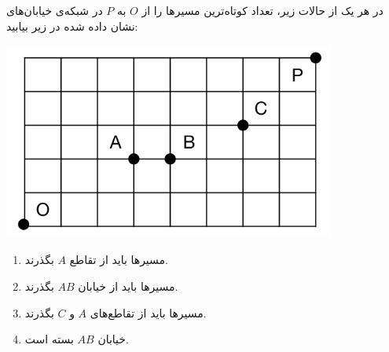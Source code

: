     \p 
در هر یک از حالات زیر، تعداد کوتاه‌ترین مسیرها را از
$O$
به
$P$
در شبکه‌ی خیابان‌های نشان داده شده در زیر بیابید:
\begin{center}
\includegraphics[height=6.5cm]{1.png}
\end{center}
\begin{enumerate}
\item
مسیرها باید از تقاطع
$A$
بگذرند.
\item
مسیرها باید از خیابان
$AB$
بگذرند.
\item
مسیرها باید از تقاطع‌های
$A$
و
$C$
بگذرند.
\item
خیابان
$AB$
بسته است.
\end{enumerate}